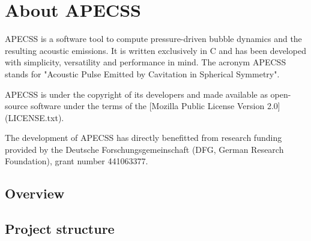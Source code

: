 \chapter{About APECSS}

APECSS is a software tool to compute pressure-driven bubble dynamics and the resulting acoustic emissions. It is written exclusively in C and has been developed with simplicity, versatility and performance in mind. The acronym APECSS stands for "Acoustic Pulse Emitted by Cavitation in Spherical Symmetry".

APECSS is under the copyright of its developers and made available as open-source software under the terms of the [Mozilla Public License Version 2.0](LICENSE.txt).

The development of APECSS has directly benefitted from research funding provided by the Deutsche Forschungsgemeinschaft (DFG, German Research Foundation), grant number 441063377.

\section{Overview}

\section{Project structure}
